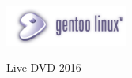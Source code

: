 \documentclass{cd-cover}
\begin{document}
\CDbookletTopMargin=0pt
\CDbookletMargin=0pt
\begin{bookletsheets}
\vspace*{5mm}
\hspace{5mm}
\begin{center}
\includegraphics[width=4cm]{site-logo}\par\bigskip
{\LARGE Live DVD 2016}
\end{center}
\end{bookletsheets}
\end{document}
